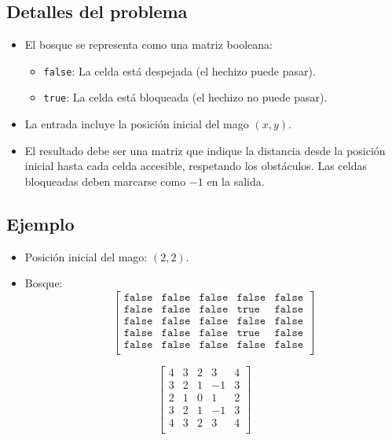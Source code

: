 \begin{enumerate}
    \subsection*{Detalles del problema}
    \begin{itemize}
        \item El bosque se representa como una matriz booleana: 
        \begin{itemize}
            \item \texttt{false}: La celda está despejada (el hechizo puede pasar).  
            \item \texttt{true}: La celda está bloqueada (el hechizo no puede pasar).  
        \end{itemize}
        \item La entrada incluye la posición inicial del mago \((x, y)\).  
        \item El resultado debe ser una matriz que indique la distancia desde la posición inicial hasta cada celda accesible, respetando los obstáculos. Las celdas bloqueadas deben marcarse como \(-1\) en la salida.  
    \end{itemize}

    \subsection*{Ejemplo}
    \begin{itemize}
            \item Posición inicial del mago: \((2, 2)\).  
            \item Bosque: 
            \[ 
            \begin{bmatrix}
                \texttt{false} & \texttt{false} & \texttt{false} & \texttt{false} & \texttt{false} \\
                \texttt{false} & \texttt{false} & \texttt{false} & \texttt{true}  & \texttt{false} \\
                \texttt{false} & \texttt{false} & \texttt{false} & \texttt{false} & \texttt{false} \\
                \texttt{false} & \texttt{false} & \texttt{false} & \texttt{true}  & \texttt{false} \\
                \texttt{false} & \texttt{false} & \texttt{false} & \texttt{false} & \texttt{false} \\
                \end{bmatrix}
            \]
    \end{itemize}
    \[
    \begin{bmatrix}
    4 & 3 & 2 & 3 & 4 \\
    3 & 2 & 1 & -1 & 3 \\
    2 & 1 & 0 & 1  & 2 \\
    3 & 2 & 1 & -1 & 3 \\
    4 & 3 & 2 & 3  & 4 \\
    \end{bmatrix}
    \]


\end{enumerate}
